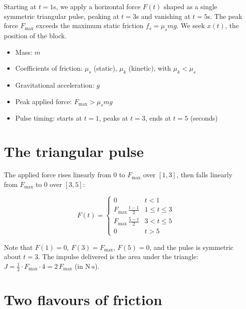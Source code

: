 \documentclass[11pt, a4paper]{article}
\begin{document}
Starting at $t = 1$\;s, we apply a horizontal force $F(t)$ shaped as a
single symmetric triangular pulse, peaking at $t = 3$\;s and vanishing
at $t = 5$\;s.  The peak force $F_{\max}$ exceeds the maximum static friction
$f_s = \mu_s mg$.  We seek $x(t)$, the position of the block.

\begin{tcolorbox}[colback=blue!5, colframe=blue!50!black, title=Physical System]
\begin{itemize}[itemsep=3pt]
    \item Mass: $m$
    \item Coefficients of friction: $\mu_s$ (static), $\mu_k$ (kinetic), with $\mu_k < \mu_s$
    \item Gravitational acceleration: $g$
    \item Peak applied force: $F_{\max} > \mu_s m g$
    \item Pulse timing: starts at $t = 1$, peaks at $t = 3$, ends at $t = 5$ (seconds)
\end{itemize}
\end{tcolorbox}

\section{The triangular pulse}
\label{sec:force}

The applied force rises linearly from $0$ to $F_{\max}$ over $[1, 3]$,
then falls linearly from $F_{\max}$ to $0$ over $[3, 5]$:

\begin{equation}
\boxed{
F(t) =
\begin{cases}
0 & t < 1 \\[4pt]
\displaystyle F_{\max}\,\frac{t - 1}{2} & 1 \le t \le 3 \\[8pt]
\displaystyle F_{\max}\,\frac{5 - t}{2} & 3 < t \le 5 \\[4pt]
0 & t > 5
\end{cases}
}
\label{eq:Ft}
\end{equation}

\noindent
Note that $F(1) = 0$, $F(3) = F_{\max}$, $F(5) = 0$, and the pulse is
symmetric about $t = 3$.  The impulse delivered is the area under the triangle:
$J = \tfrac{1}{2} \cdot F_{\max} \cdot 4 = 2\,F_{\max}$ (in N$\cdot$s).

\section{Two flavours of friction}
\label{sec:friction}
\end{document}
